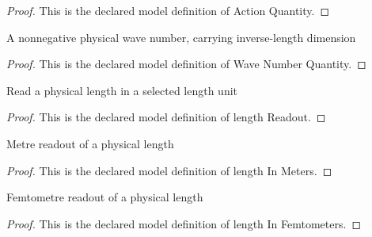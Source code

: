\begin{proof}
  This is the declared model definition of Action Quantity.
\end{proof}
\begin{definition}
  \label{def:physics:phyx-mini-0520:phyxminiproblems-problemphyxmini0520-wavenumberquantity}
  A nonnegative physical wave number, carrying inverse-length dimension
\end{definition}
\begin{proof}
  This is the declared model definition of Wave Number Quantity.
\end{proof}
\begin{definition}
  \label{def:physics:phyx-mini-0520:phyxminiproblems-problemphyxmini0520-lengthreadout}
  Read a physical length in a selected length unit
\end{definition}
\begin{proof}
  This is the declared model definition of length Readout.
\end{proof}
\begin{definition}
  \label{def:physics:phyx-mini-0520:phyxminiproblems-problemphyxmini0520-lengthinmeters}
  Metre readout of a physical length
\end{definition}
\begin{proof}
  This is the declared model definition of length In Meters.
\end{proof}
\begin{definition}
  \label{def:physics:phyx-mini-0520:phyxminiproblems-problemphyxmini0520-lengthinfemtometers}
  Femtometre readout of a physical length
\end{definition}
\begin{proof}
  This is the declared model definition of length In Femtometers.
\end{proof}
